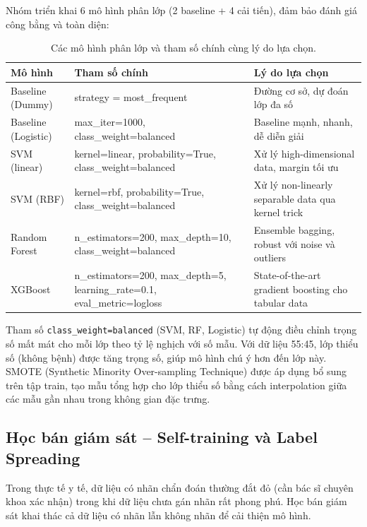 Nhóm triển khai 6 mô hình phân lớp (2 baseline + 4 cải tiến), đảm bảo đánh giá công bằng và toàn diện:

\begin{table}[H]
\centering
\caption{Các mô hình phân lớp và tham số chính cùng lý do lựa chọn.}
\label{tab:models}
\small
\begin{tabular}{|l|p{5cm}|p{5cm}|}
\hline
\textbf{Mô hình} & \textbf{Tham số chính} & \textbf{Lý do lựa chọn} \\ \hline
Baseline (Dummy) & strategy = most\_frequent & Đường cơ sở, dự đoán lớp đa số \\ \hline
Baseline (Logistic) & max\_iter=1000, class\_weight=balanced & Baseline mạnh, nhanh, dễ diễn giải \\ \hline
SVM (linear) \cite{cortes1995support} & kernel=linear, probability=True, class\_weight=balanced & Xử lý high-dimensional data, margin tối ưu \\ \hline
SVM (RBF) \cite{cortes1995support} & kernel=rbf, probability=True, class\_weight=balanced & Xử lý non-linearly separable data qua kernel trick \\ \hline
Random Forest \cite{breiman2001random} & n\_estimators=200, max\_depth=10, class\_weight=balanced & Ensemble bagging, robust với noise và outliers \\ \hline
XGBoost \cite{chen2016xgboost} & n\_estimators=200, max\_depth=5, learning\_rate=0.1, eval\_metric=logloss & State-of-the-art gradient boosting cho tabular data \\ \hline
\end{tabular}
\end{table}

Tham số \texttt{class\_weight=balanced} (SVM, RF, Logistic) tự động điều chỉnh trọng số mất mát cho mỗi lớp theo tỷ lệ nghịch với số mẫu. Với dữ liệu 55:45, lớp thiểu số (không bệnh) được tăng trọng số, giúp mô hình chú ý hơn đến lớp này. SMOTE (Synthetic Minority Over-sampling Technique) \cite{chawla2002smote} được áp dụng bổ sung trên tập train, tạo mẫu tổng hợp cho lớp thiểu số bằng cách interpolation giữa các mẫu gần nhau trong không gian đặc trưng.

\subsection{Học bán giám sát -- Self-training và Label Spreading}

Trong thực tế y tế, dữ liệu có nhãn chẩn đoán thường đắt đỏ (cần bác sĩ chuyên khoa xác nhận) trong khi dữ liệu chưa gán nhãn rất phong phú. Học bán giám sát \cite{chapelle2006semi} khai thác cả dữ liệu có nhãn lẫn không nhãn để cải thiện mô hình.

